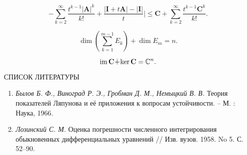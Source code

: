 \documentclass{article}
\begin{document}
$$
-\sum \limits_{k = 2}^\infty \frac{t^{k - 1}|\textbf{A}|^k}{k!} + \frac{|\textbf{I} + t\textbf{A}| - |\textbf{I}|}{t} | \leq \textbf{C} + \sum \limits_{k = 2}^\infty \frac{t^{k - 1} \textbf{C}^k}{k!}.
$$

$$
\dim \left( \sum \limits_{k = 1}^{m - 1} E_k \right) + \dim E_m = n.
$$

$$
\textup{im} \, \textbf{C} \! \dotplus \! \textup{ker} \, \textbf{C} = \mathbb{C}^n.
$$ \pagebreak

\begin{center}
СПИСОК ЛИТЕРАТУРЫ
\end{center}

\begin{enumerate}
\item \textit{Былов Б. Ф., Виноград Р. Э., Гробман Д. М., Немыцкий В. В.} Теория показателей Ляпунова и её приложения к вопросам устойчивости. – М. : Наука, 1966.
\item \textit{Лозинский С. М.} Оценка погрешности численного интегрирования обыкновенных дифференциальных уравнений // Изв. вузов. 1958. No 5. С. 52–90.
\end{enumerate}
\end{document}
